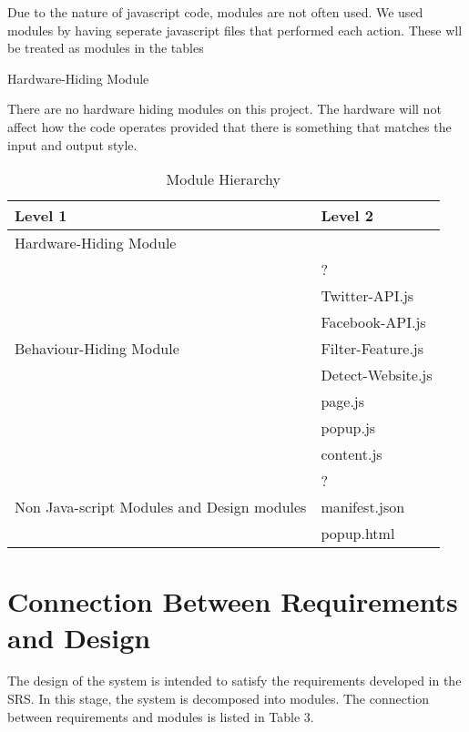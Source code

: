 \documentclass[12pt, titlepage]{article}
\newcounter{mnum}
\newcommand{\mthemnum}{M\themnum}
\begin{document}
Due to the nature of javascript code, modules are not often used. We used modules by having seperate javascript files that performed each action. These wll be treated as modules in the tables
\begin{description}
\item [ \mthemnum \label{mHH}:] Hardware-Hiding Module
\item There are no hardware hiding modules on this project. The hardware will not affect how the code operates provided that there is something that matches the input and output style. 
\end{description}
\begin{table}[h!]
\centering
\begin{tabular}{p{} p{}}
\toprule
\textbf{Level 1} & \textbf{Level 2}\\
\midrule
{Hardware-Hiding Module} & ~ \\
\midrule
\multirow{7}{0.3\textwidth}{Behaviour-Hiding Module} & ?\\
& Twitter-API.js\\
& Facebook-API.js\\
&Filter-Feature.js\\
&Detect-Website.js\\
& page.js\\
& popup.js\\
& content.js\\
\midrule
\multirow{3}{0.3\textwidth}{Non Java-script Modules and Design modules} & {?}\\
& manifest.json\\
& popup.html \\
\bottomrule
\end{tabular}
\caption{Module Hierarchy}
\label{TblMH}
\end{table}
\section{Connection Between Requirements and Design} \label{SecConnection}
The design of the system is intended to satisfy the requirements developed in
the SRS. In this stage, the system is decomposed into modules. The connection
between requirements and modules is listed in Table 3.
\end{document}
